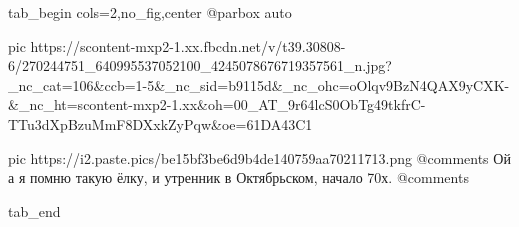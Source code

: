  
 
 
 
 


\ifcmt
  tab_begin cols=2,no_fig,center
		 @parbox auto

     pic https://scontent-mxp2-1.xx.fbcdn.net/v/t39.30808-6/270244751_640995537052100_4245078676719357561_n.jpg?_nc_cat=106&ccb=1-5&_nc_sid=b9115d&_nc_ohc=oOlqv9BzN4QAX9yCXK-&_nc_ht=scontent-mxp2-1.xx&oh=00_AT_9r64lcS0ObTg49tkfrC-TTu3dXpBzuMmF8DXxkZyPqw&oe=61DA43C1

		 pic https://i2.paste.pics/be15bf3be6d9b4de140759aa70211713.png
		 @comments%
				Ой а я помню такую ёлку, и утренник в Октябрьском, начало 70х.
		 @comments%

  tab_end
\fi
